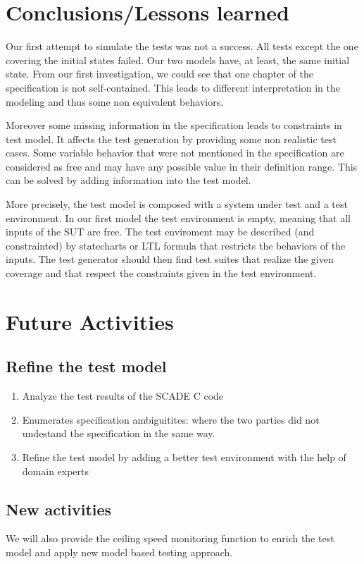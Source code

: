 \section{Conclusions/Lessons learned}

Our first attempt to simulate the tests was not a success. All tests
except the one covering the initial states failed. Our two models
have, at least, the same initial state.
From  our first investigation, we could see that one chapter of
the specification is not self-contained. This leads to different
interpretation in the modeling and thus some non equivalent behaviors.

Moreover some missing information in the specification leads to 
 constraints in test model. It affects the test generation by
providing some non realistic test cases. Some variable behavior that
were not mentioned in the specification are considered as free and may have any
possible value in their definition range. This can be solved by adding
information into the test model. 

More precisely, the test model is composed with a system under test
and a test environment. In our first model the test environment is
empty, meaning that all inputs of the SUT are free. The test
enviroment may be described (and constrainted) by statecharts or
LTL formula that restricts the behaviors of the inputs. The test
generator should then find  test suites that realize the given
coverage and that respect the constraints given in the test environment.



\section{Future Activities}
\subsection{Refine the test model}
\begin{enumerate}
\item Analyze the test results of the SCADE C code
\item Enumerates specification ambiguitites: where the two parties did
  not undestand the specification in the same way.
\item Refine the test model by adding a better test environment with
  the help of domain experts
\end{enumerate}
\subsection{New activities}
We will also provide the ceiling speed monitoring function to enrich
the test model and apply new model based testing approach.

%
%


